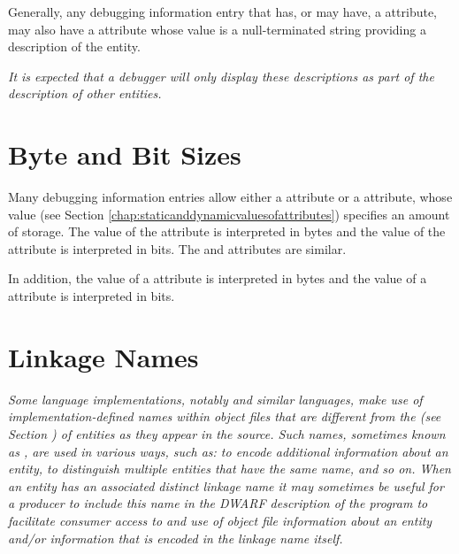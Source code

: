 Generally, any debugging information entry that 
\hypertarget{chap:DWATdescriptionartificialnameordescription}{}
has, or may have, 
a 
\DWATname{} attribute, may
also have 
a 
\DWATdescription{} attribute whose value is a
null-terminated string providing a description of the entity.

\textit{It is expected that a debugger will only display these
descriptions as part of the description of other entities.}

\section{Byte and Bit Sizes}
\label{chap:byteandbitsizes}
Many debugging information entries allow either a
\DWATbytesize{} attribute or a 
\DWATbitsize{} attribute,
whose  value 
(see Section \ref{chap:staticanddynamicvaluesofattributes}) 
specifies an
amount of storage. The value of the 
\DWATbytesize{} attribute
is interpreted in bytes and the value of the 
\DWATbitsize{}
attribute is interpreted in bits. The
\DWATstringlengthbytesize{} and 
\DWATstringlengthbitsize{} 
attributes are similar.

In addition, the 
value of a \DWATbytestride{} attribute is interpreted
in bytes and the  value of a 
\DWATbitstride{}
attribute is interpreted in bits.

\section{Linkage Names}
\label{chap:linkagenames}
\textit{Some language implementations, notably 
 and similar
languages, make use of implementation-defined names within
object files that are different from the 
(see Section ) of entities as they 
appear in the source. Such names, sometimes known as 
,
are used in various ways, such as: to encode additional
information about an entity, to distinguish multiple entities
that have the same name, and so on. When an entity has an
associated distinct linkage name it may sometimes be useful
for a producer to include this name in the DWARF description
of the program to facilitate consumer access to and use of
object file information about an entity and/or information
\hypertarget{chap:DWATlinkagenameobjectfilelinkagenameofanentity}{}
that is encoded in the linkage name itself.  
}

